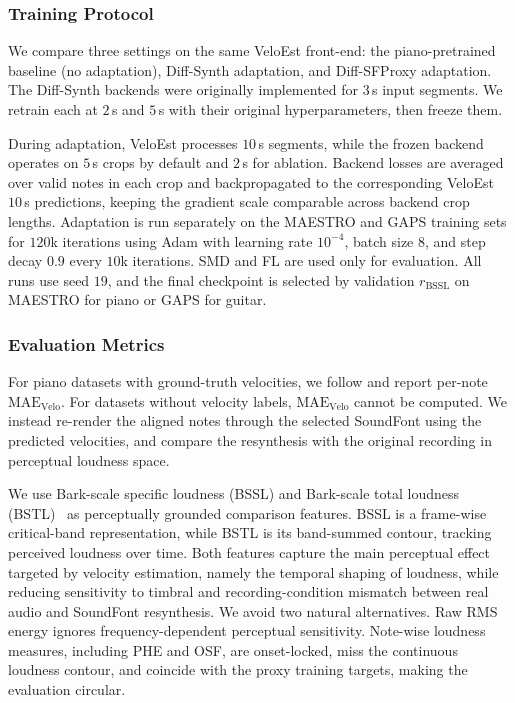 \documentclass{article}
\begin{document}
\subsubsection{Training Protocol} 
We compare three settings on the same VeloEst front-end: the piano-pretrained baseline (no adaptation), Diff-Synth adaptation, and Diff-SFProxy adaptation. The Diff-Synth backends \cite{renault2023ddsp_piano, jonason2024guitar} were originally implemented for $3$\,s input segments. We retrain each at $2$\,s and $5$\,s with their original hyperparameters, then freeze them.
 
During adaptation, VeloEst processes $10$\,s segments, while the frozen backend operates on $5$\,s crops by default and $2$\,s for ablation. Backend losses are averaged over valid notes in each crop and backpropagated to the corresponding VeloEst $10$\,s predictions, keeping the gradient scale comparable across backend crop lengths. Adaptation is run separately on the MAESTRO and GAPS training sets for $120$k iterations using Adam with learning rate $10^{-4}$, batch size $8$, and step decay $0.9$ every $10$k iterations. SMD and FL are used only for evaluation. All runs use seed $19$, and the final checkpoint is selected by validation $r_{\mathrm{BSSL}}$ on MAESTRO for piano or GAPS for guitar.

\subsubsection{Evaluation Metrics}
For piano datasets with ground-truth velocities, we follow \cite{kim2024method, he2026score} and report per-note $\mathrm{MAE}_{\mathrm{Velo}}$. For datasets without velocity labels, $\mathrm{MAE}_{\mathrm{Velo}}$ cannot be computed. We instead re-render the aligned notes through the selected SoundFont using the predicted velocities, and compare the resynthesis with the original recording in perceptual loudness space.

We use Bark-scale specific loudness (BSSL) and Bark-scale total loudness (BSTL)~\cite{zwicker1999psychoacoustics, he2026dynest} as perceptually grounded comparison features. BSSL is a frame-wise critical-band representation, while BSTL is its band-summed contour, tracking perceived loudness over time. Both features capture the main perceptual effect targeted by velocity estimation, namely the temporal shaping of loudness, while reducing sensitivity to timbral and recording-condition mismatch between real audio and SoundFont resynthesis. We avoid two natural alternatives. Raw RMS energy ignores frequency-dependent perceptual sensitivity. Note-wise loudness measures, including PHE and OSF, are onset-locked, miss the continuous loudness contour, and coincide with the proxy training targets, making the evaluation circular.
\end{document}
